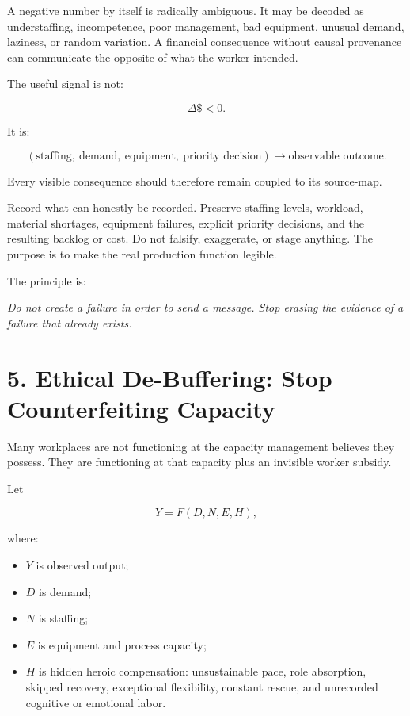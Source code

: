 \documentclass[11pt,oneside]{article}
\providecommand{\tightlist}{%
  \setlength{\itemsep}{0.22em}\setlength{\parskip}{0pt}}
\renewenvironment{quote}
  {\begin{tcolorbox}[
      enhanced,
      breakable,
      colback=ManifestLight,
      colframe=ManifestRule,
      boxrule=0pt,
      leftrule=3pt,
      arc=0pt,
      outer arc=0pt,
      left=10pt,right=10pt,top=8pt,bottom=8pt,
      before skip=0.8em,after skip=0.8em
    ]\itshape}
  {\end{tcolorbox}}
\begin{document}
A negative number by itself is radically ambiguous. It may be decoded as
understaffing, incompetence, poor management, bad equipment, unusual
demand, laziness, or random variation. A financial consequence without
causal provenance can communicate the opposite of what the worker
intended.

The useful signal is not:

\[
\Delta \$ < 0.
\]

It is:

\[
(\text{staffing},\ \text{demand},\ \text{equipment},\ \text{priority decision})
\longrightarrow
\text{observable outcome}.
\]

Every visible consequence should therefore remain coupled to its
source-map.

Record what can honestly be recorded. Preserve staffing levels,
workload, material shortages, equipment failures, explicit priority
decisions, and the resulting backlog or cost. Do not falsify,
exaggerate, or stage anything. The purpose is to make the real
production function legible.

The principle is:

\begin{quote}
Do not create a failure in order to send a message. Stop erasing the
evidence of a failure that already exists.
\end{quote}

\section{5. Ethical De-Buffering: Stop Counterfeiting
Capacity}\label{ethical-de-buffering-stop-counterfeiting-capacity}

Many workplaces are not functioning at the capacity management believes
they possess. They are functioning at that capacity plus an invisible
worker subsidy.

Let

\[
Y = F(D,N,E,H),
\]

where:

\begin{itemize}
\tightlist
\item
  \(Y\) is observed output;
\item
  \(D\) is demand;
\item
  \(N\) is staffing;
\item
  \(E\) is equipment and process capacity;
\item
  \(H\) is hidden heroic compensation: unsustainable pace, role
  absorption, skipped recovery, exceptional flexibility, constant
  rescue, and unrecorded cognitive or emotional labor.
\end{itemize}
\end{document}
